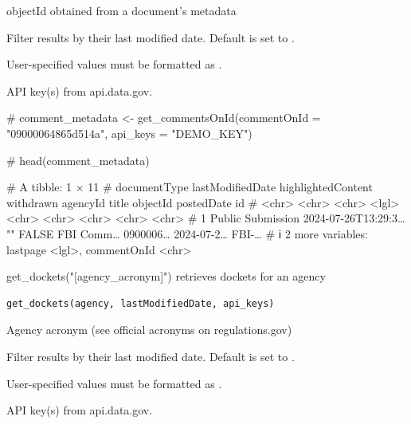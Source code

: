 \documentclass[a4paper]{book}
\begin{document}
%
\begin{Arguments}
\begin{ldescription}
\item[\code{objectId}] 
objectId obtained from a document's metadata 

\item[\code{lastModifiedDate}] 
Filter results by their last modified date. Default is set to . 

User-specified values must be formatted as .


\item[\code{api\_keys}] API key(s) from api.data.gov. 

\end{ldescription}
\end{Arguments}
%
\begin{Examples}
\begin{ExampleCode}

# comment_metadata <- get_commentsOnId(commentOnId = "09000064865d514a", api_keys = "DEMO_KEY")

# head(comment_metadata)

# A tibble: 1 × 11
#   documentType      lastModifiedDate    highlightedContent withdrawn agencyId title objectId postedDate id   
#   <chr>             <chr>               <chr>              <lgl>     <chr>    <chr> <chr>    <chr>      <chr>
# 1 Public Submission 2024-07-26T13:29:3… ""                 FALSE     FBI      Comm… 0900006… 2024-07-2… FBI-…
# ℹ 2 more variables: lastpage <lgl>, commentOnId <chr>
\end{ExampleCode}
\end{Examples}
%
\begin{Description}
get\_dockets("[agency\_acronym]") retrieves dockets for an agency
\end{Description}
%
\begin{Usage}
\begin{verbatim}
get_dockets(agency, lastModifiedDate, api_keys)
\end{verbatim}
\end{Usage}
%
\begin{Arguments}
\begin{ldescription}
\item[\code{agency}] 
Agency acronym (see official acronyms on regulations.gov)

\item[\code{lastModifiedDate}] 
Filter results by their last modified date. Default is set to . 

User-specified values must be formatted as .


\item[\code{api\_keys}] API key(s) from api.data.gov. 

\end{ldescription}
\end{Arguments}
\end{document}
